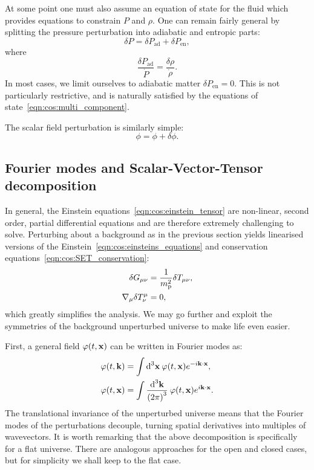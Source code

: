 At some point one must also assume an equation of state for the fluid which provides equations to constrain $P$ and $\rho$. One can remain fairly general by splitting the pressure perturbation into adiabatic and entropic parts:
\begin{equation}
  \delta P = \delta P_\mathrm{ad} + \delta P_\mathrm{en},
  \label{eqn:cos:adiabatic_entropic}
\end{equation} 
where
\begin{equation}
  \frac{\delta P_\mathrm{ad}}{\dot{P}} = \frac{\delta\rho}{\dot{\rho}}.
  \label{eqn:cos:adiabatic}
\end{equation} 
In most cases, we limit ourselves to adiabatic matter $\delta P_\mathrm{en}=0$.
This is not particularly restrictive, and is naturally satisfied by the equations of state~\eqref{eqn:cos:multi_component}.

The scalar field perturbation is similarly simple:
\begin{equation}
  \phi = \phi + \delta\phi.
\end{equation}

\subsection{Fourier modes and Scalar-Vector-Tensor decomposition}
In general, the Einstein equations~\eqref{eqn:cos:einstein_tensor} are non-linear, second order, partial differential equations and are therefore extremely challenging to solve. Perturbing about a background as in the previous section yields linearised versions of the Einstein~\eqref{eqn:cos:einsteins_equations} and conservation equations~\eqref{eqn:cos:SET_conservation}:
\begin{align}
  \delta G_{\mu\nu} &= \frac{1}{\m^2}\delta T_{\mu\nu},
  \label{eqn:cos:einsteins_equations_perturb} \\
  \nabla_\mu\delta T^{\mu}_{\nu} &=0,
  \label{eqn:cos:SET_conservation_perturb}
\end{align}
which greatly simplifies the analysis.  
We may go further and exploit the symmetries of the background unperturbed universe to make life even easier.

First, a general field $\varphi(t,\vx)$ can be written in Fourier modes as:
\begin{align}
  \varphi(t,\vk) &= \int \d[3]{\vx}\: \varphi(t,\vx) e^{-i\vk \cdot \vx},\\
  \varphi(t,\vx) &= \int \frac{\d[3]{\vk}}{{(2\pi)}^3}\: \varphi(t,\vx) e^{i\vk \cdot \vx}.
\end{align}
The translational invariance of the unperturbed universe means that the Fourier modes of the perturbations decouple, turning spatial derivatives into multiples of wavevectors. 
It is worth remarking that the above decomposition is specifically for a flat universe. There are analogous approaches for the open and closed cases, but for simplicity we shall keep to the flat case. 

